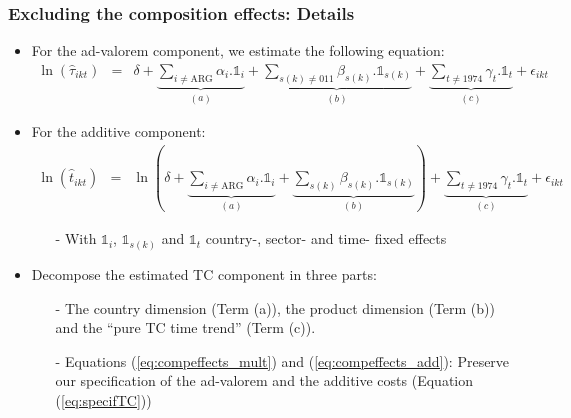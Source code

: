 \documentclass[10 pt,Helvetica, french]{beamer}
\begin{document}
\begin{frame}[label = app_compeffects_details1]
\frametitle{Excluding the composition effects: Details}
\begin{itemize}
\item For the ad-valorem component, we estimate the following equation:
\footnotesize
\begin{eqnarray}
\ln(\widehat{\tau}_{ikt})&=&\delta +\underbrace{\sum_{i \neq \text{ARG}}\alpha_i.\mathbb{1}_i}_{(a)} + \underbrace{\sum_{s(k)\neq \text{011}}\beta_{s(k)}.\mathbb{1}_{s(k)}}_{(b)} + \underbrace{\sum_{t \neq 1974}\gamma_t.\mathbb{1}_t}_{(c)}+\epsilon_{ikt} \label{eq:compeffects_mult}
\end{eqnarray}
\normalsize
\item For the additive component:
\footnotesize
\begin{eqnarray}
\ln(\widehat{t}_{ikt})&=&\ln\left( \delta + \underbrace{\sum_{i \neq \text{ARG}}  \alpha_i.\mathbb{1}_i}_{(a)}+\underbrace{\sum_{s(k)}\beta_{s(k)}.\mathbb{1}_{s(k)}}_{(b)}\right) + \underbrace{\sum_{t \neq 1974}\gamma_t.\mathbb{1}_t}_{(c)}+\epsilon_{ikt} \label{eq:compeffects_add}
\end{eqnarray}
\normalsize
\begin{itemize}
\item[-] With $\mathbb{1}_i$, $\mathbb{1}_{s(k)}$ and $\mathbb{1}_{t}$ country-, sector- and time- fixed effects \vspace{0.1cm}
\end{itemize}
\item Decompose the estimated TC component in three parts:  \vspace{0.1cm}
\begin{itemize}
\item[-] The country dimension (Term (a)), the product dimension (Term (b)) and the ``pure TC time trend'' (Term (c)).  \vspace{0.1cm}
\item[-] Equations (\ref{eq:compeffects_mult}) and (\ref{eq:compeffects_add}): Preserve our specification of the ad-valorem and the additive costs (Equation (\ref{eq:specifTC}))
\end{itemize}
\end{itemize}
\end{frame}
\end{document}

